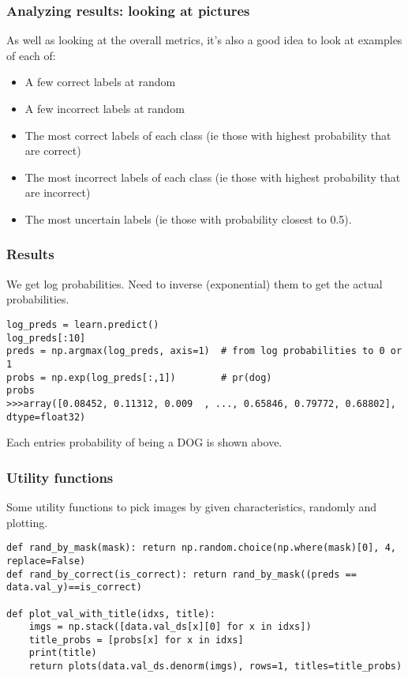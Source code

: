 \begin{frame}[fragile] \frametitle{Analyzing results: looking at pictures}
As well as looking at the overall metrics, it's also a good idea to look at examples of each of:
\begin{itemize}
\item A few correct labels at random
\item A few incorrect labels at random
\item The most correct labels of each class (ie those with highest probability that are correct)
\item The most incorrect labels of each class (ie those with highest probability that are incorrect)
\item The most uncertain labels (ie those with probability closest to 0.5).
\end{itemize}

\end{frame}

\begin{frame}[fragile] \frametitle{Results}
We get log probabilities. Need to inverse (exponential) them to get the actual probabilities. 
\begin{lstlisting}
log_preds = learn.predict()
log_preds[:10]
preds = np.argmax(log_preds, axis=1)  # from log probabilities to 0 or 1
probs = np.exp(log_preds[:,1])        # pr(dog)
probs
>>>array([0.08452, 0.11312, 0.009  , ..., 0.65846, 0.79772, 0.68802], dtype=float32)
\end{lstlisting}
Each entries probability of being a DOG is shown above.
\end{frame}


\begin{frame}[fragile] \frametitle{Utility functions}
Some utility functions to pick images by given characteristics, randomly and plotting.
\begin{lstlisting}
def rand_by_mask(mask): return np.random.choice(np.where(mask)[0], 4, replace=False)
def rand_by_correct(is_correct): return rand_by_mask((preds == data.val_y)==is_correct)

def plot_val_with_title(idxs, title):
    imgs = np.stack([data.val_ds[x][0] for x in idxs])
    title_probs = [probs[x] for x in idxs]
    print(title)
    return plots(data.val_ds.denorm(imgs), rows=1, titles=title_probs)
\end{lstlisting}

\end{frame}

